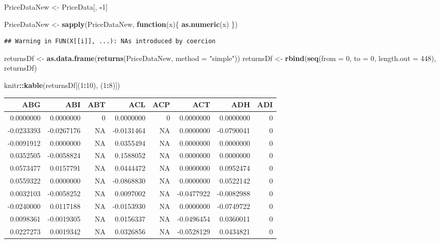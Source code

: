 \documentclass[]{article}
\newenvironment{Shaded}{\begin{snugshade}}{\end{snugshade}}
\newcommand{\KeywordTok}[1]{\textcolor[rgb]{0.13,0.29,0.53}{\textbf{#1}}}
\newcommand{\DataTypeTok}[1]{\textcolor[rgb]{0.13,0.29,0.53}{#1}}
\newcommand{\DecValTok}[1]{\textcolor[rgb]{0.00,0.00,0.81}{#1}}
\newcommand{\StringTok}[1]{\textcolor[rgb]{0.31,0.60,0.02}{#1}}
\newcommand{\ControlFlowTok}[1]{\textcolor[rgb]{0.13,0.29,0.53}{\textbf{#1}}}
\newcommand{\OperatorTok}[1]{\textcolor[rgb]{0.81,0.36,0.00}{\textbf{#1}}}
\newcommand{\NormalTok}[1]{#1}
\begin{document}
\begin{Shaded}
\begin{Highlighting}[]
\NormalTok{PriceDataNew <-}\StringTok{  }\NormalTok{PriceData[, }\OperatorTok{-}\DecValTok{1}\NormalTok{]}

\NormalTok{PriceDataNew <-}\StringTok{  }\KeywordTok{sapply}\NormalTok{(PriceDataNew, }\ControlFlowTok{function}\NormalTok{(x)\{}
  \KeywordTok{as.numeric}\NormalTok{(x)}
\NormalTok{\})}
\end{Highlighting}
\end{Shaded}

\begin{verbatim}
## Warning in FUN(X[[i]], ...): NAs introduced by coercion
\end{verbatim}

\begin{Shaded}
\begin{Highlighting}[]
\NormalTok{returnsDf <-}\StringTok{ }\KeywordTok{as.data.frame}\NormalTok{(}\KeywordTok{returns}\NormalTok{(PriceDataNew, }\DataTypeTok{method =} \StringTok{"simple"}\NormalTok{))}
\NormalTok{returnsDf <-}\StringTok{  }\KeywordTok{rbind}\NormalTok{(}\KeywordTok{seq}\NormalTok{(}\DataTypeTok{from =} \DecValTok{0}\NormalTok{, }\DataTypeTok{to =} \DecValTok{0}\NormalTok{, }\DataTypeTok{length.out =} \DecValTok{448}\NormalTok{), returnsDf)}

\NormalTok{knitr}\OperatorTok{::}\KeywordTok{kable}\NormalTok{(returnsDf[(}\DecValTok{1}\OperatorTok{:}\DecValTok{10}\NormalTok{), (}\DecValTok{1}\OperatorTok{:}\DecValTok{8}\NormalTok{)])}
\end{Highlighting}
\end{Shaded}

\begin{longtable}[]{@{}rrrrrrrr@{}}
\toprule
ABG & ABI & ABT & ACL & ACP & ACT & ADH & ADI\tabularnewline
\midrule
\endhead
0.0000000 & 0.0000000 & 0 & 0.0000000 & 0 & 0.0000000 & 0.0000000 &
0\tabularnewline
-0.0233393 & -0.0267176 & NA & -0.0131464 & NA & 0.0000000 & -0.0790041
& 0\tabularnewline
-0.0091912 & 0.0000000 & NA & 0.0355494 & NA & 0.0000000 & 0.0000000 &
0\tabularnewline
0.0352505 & -0.0058824 & NA & 0.1588052 & NA & 0.0000000 & 0.0000000 &
0\tabularnewline
0.0573477 & 0.0157791 & NA & 0.0444472 & NA & 0.0000000 & 0.0952474 &
0\tabularnewline
0.0559322 & 0.0000000 & NA & -0.0868830 & NA & 0.0000000 & 0.0522142 &
0\tabularnewline
0.0032103 & -0.0058252 & NA & 0.0097002 & NA & -0.0477922 & -0.0082988 &
0\tabularnewline
-0.0240000 & 0.0117188 & NA & -0.0153930 & NA & 0.0000000 & -0.0749722 &
0\tabularnewline
0.0098361 & -0.0019305 & NA & 0.0156337 & NA & -0.0496454 & 0.0360011 &
0\tabularnewline
0.0227273 & 0.0019342 & NA & 0.0326856 & NA & -0.0528129 & 0.0434821 &
0\tabularnewline
\bottomrule
\end{longtable}
\end{document}
